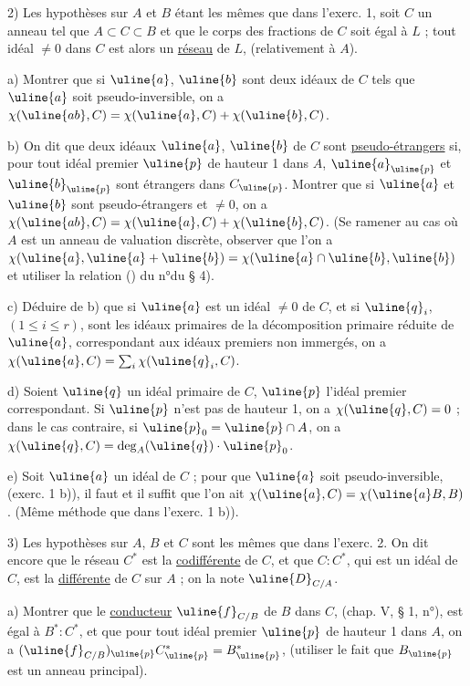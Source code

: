 2) Les hypothèses sur $A$ et $B$ étant les mêmes que dans l'exerc. 1, soit $C$ un anneau tel que $A\subset C\subset B$ et que le corps des fractions de $C$ soit égal à $L$ ; tout idéal $\neq0$ dans $C$ est alors un \uline{réseau} de $L$, (relativement à $A$).

a) Montrer que si $\uline{a}$, $\uline{b}$ sont deux idéaux de $C$ tels que $\uline{a}$ soit pseudo-inversible, on a $\chi(\uline{ab},C)=\chi(\uline{a},C)+\chi(\uline{b},C)$.

b) On dit que deux idéaux $\uline{a}$, $\uline{b}$ de $C$ sont \uline{pseudo-étrangers} si, pour tout idéal premier $\uline{p}$ de hauteur 1 dans $A$, $\uline{a}_{\uline{p}}$ et $\uline{b}_{\uline{p}}$ sont étrangers dans $C_{\uline{p}}$. Montrer que si $\uline{a}$ et $\uline{b}$ sont pseudo-étrangers et $\neq0$, on a $\chi(\uline{ab},C)=\chi(\uline{a},C)+\chi(\uline{b},C)$. (Se ramener au cas où $A$ est un anneau de valuation discrète, observer que l'on a $\chi(\uline{a},\uline{a}+\uline{b})=\chi(\uline{a}\cap\uline{b},\uline{b})$ et utiliser la relation (\quad) du n°\quad du § 4).

c) Déduire de b) que si $\uline{a}$ est un idéal $\neq0$ de $C$, et si $\uline{q}_i$, $(1\leq i\leq r)$, sont les idéaux primaires de la décomposition primaire réduite de $\uline{a}$, correspondant aux idéaux premiers non immergés, on a $\chi(\uline{a},C)=\sum_i\chi(\uline{q}_i,C)$.

d) Soient $\uline{q}$ un idéal primaire de $C$, $\uline{p}$ l'idéal premier correspondant. Si $\uline{p}$ n'est pas de hauteur 1, on a $\chi(\uline{q},C)=0$ ; dans le cas contraire, si $\uline{p}_0=\uline{p}\cap A$, on a $\chi(\uline{q},C)=\deg_A(\uline{q})\cdot\uline{p}_0$.

e) Soit $\uline{a}$ un idéal de $C$ ; pour que $\uline{a}$ soit pseudo-inversible, (exerc. 1 b)), il faut et il suffit que l'on ait $\chi(\uline{a},C)=\chi(\uline{a}B,B)$. (Même méthode que dans l'exerc. 1 b)).

3) Les hypothèses sur $A$, $B$ et $C$ sont les mêmes que dans l'exerc. 2. On dit encore que le réseau $C^*$ est la \uline{codifférente} de $C$, et que $C:C^*$, qui est un idéal de $C$, est la \uline{différente} de $C$ sur $A$ ; on la note $\uline{D}_{C/A}$.

a) Montrer que le \uline{conducteur} $\uline{f}_{C/B}$ de $B$ dans $C$, (chap. V, § 1, n°\quad), est égal à $B^*:C^*$, et que pour tout idéal premier $\uline{p}$ de hauteur 1 dans $A$, on a $(\uline{f}_{C/B})_{\uline{p}}C^*_{\uline{p}}=B^*_{\uline{p}}$, (utiliser le fait que $B_{\uline{p}}$ est un anneau principal).

